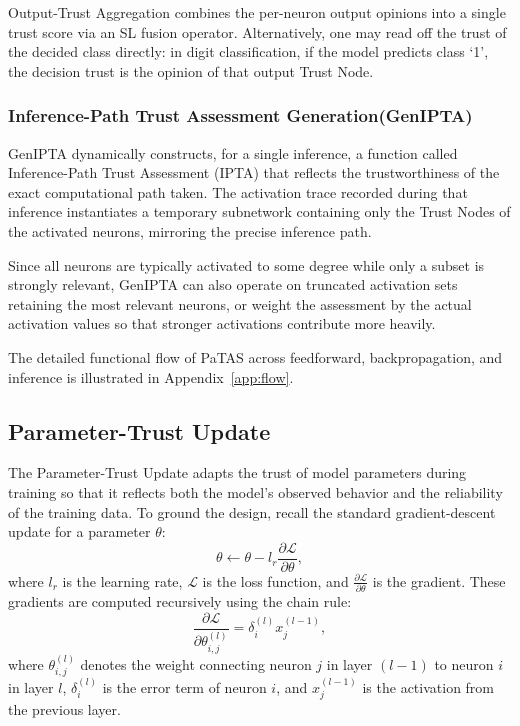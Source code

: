 Output-Trust Aggregation combines the per-neuron output opinions into a single trust score via an SL fusion operator. Alternatively, one may read off the trust of the decided class directly: in digit classification, if the model predicts class `1', the decision trust is the opinion of that output Trust Node.

\subsubsection{Inference-Path Trust Assessment Generation(GenIPTA)}

GenIPTA dynamically constructs, for a single inference, a function called Inference-Path Trust Assessment (IPTA) that reflects the trustworthiness of the exact computational path taken. The activation trace recorded during that inference instantiates a temporary subnetwork containing only the Trust Nodes of the activated neurons, mirroring the precise inference path. 

Since all neurons are typically activated to some degree while only a subset is strongly relevant, GenIPTA can also operate on truncated activation sets retaining the most relevant neurons, or weight the assessment by the actual activation values so that stronger activations contribute more heavily.

The detailed functional flow of PaTAS across feedforward, backpropagation, and inference is illustrated in Appendix~\ref{app:flow}.

\vspace{-0.5em}
\subsection{Parameter-Trust Update}\label{sec:ptasfunc}
The Parameter-Trust Update adapts the trust of model parameters during training so that it reflects both the model's observed behavior and the reliability of the training data. To ground the design, recall the standard gradient-descent update for a parameter $\theta$:
\begin{equation}
\label{eq:gd1}
\theta \leftarrow \theta - l_r  \frac{\partial \mathcal{L}}{\partial \theta},
\end{equation}
where $l_r$ is the learning rate, $\mathcal{L}$ is the loss function, and $\frac{\partial \mathcal{L}}{\partial \theta}$ is the gradient. These gradients are computed recursively using the chain rule:
\begin{equation}
\label{eq:gd2}
\frac{\partial \mathcal{L}}{\partial \theta^{(l)}_{i,j}}
= \delta^{(l)}_i x^{(l-1)}_j,
\end{equation}
where $\theta^{(l)}_{i,j}$ denotes the weight connecting neuron $j$ in layer $(l-1)$ to neuron $i$ in layer $l$, $\delta^{(l)}_i$ is the error term of neuron $i$, and $x^{(l-1)}_j$ is the activation from the previous layer.

